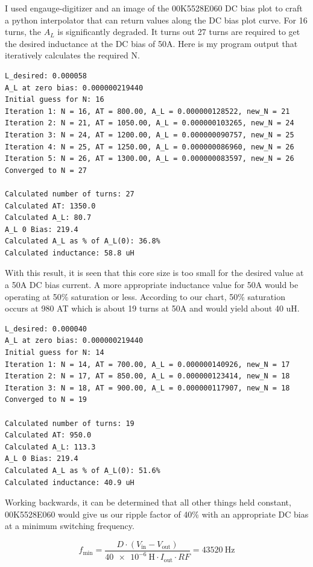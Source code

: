 \documentclass{article}
\begin{document}
I used engauge-digitizer and an image of the 00K5528E060 DC bias plot to craft a python interpolator that can return values along the DC bias plot curve.  For 16 turns, the \( A_L \) is significantly degraded.  It turns out 27 turns are required to get the desired inductance at the DC bias of 50A.  Here is my program output that iteratively calculates the required N.

\begin{verbatim}
L_desired: 0.000058
A_L at zero bias: 0.000000219440
Initial guess for N: 16
Iteration 1: N = 16, AT = 800.00, A_L = 0.000000128522, new_N = 21
Iteration 2: N = 21, AT = 1050.00, A_L = 0.000000103265, new_N = 24
Iteration 3: N = 24, AT = 1200.00, A_L = 0.000000090757, new_N = 25
Iteration 4: N = 25, AT = 1250.00, A_L = 0.000000086960, new_N = 26
Iteration 5: N = 26, AT = 1300.00, A_L = 0.000000083597, new_N = 26
Converged to N = 27

Calculated number of turns: 27
Calculated AT: 1350.0
Calculated A_L: 80.7
A_L 0 Bias: 219.4
Calculated A_L as % of A_L(0): 36.8%
Calculated inductance: 58.8 uH
\end{verbatim}

With this result, it is seen that this core size is too small for the desired value at a 50A DC bias current.  A more appropriate inductance value for 50A would be operating at 50\% saturation or less.  According to our chart, 50\% saturation occurs at 980 AT which is about 19 turns at 50A and would yield about 40 uH.

\begin{verbatim}
L_desired: 0.000040
A_L at zero bias: 0.000000219440
Initial guess for N: 14
Iteration 1: N = 14, AT = 700.00, A_L = 0.000000140926, new_N = 17
Iteration 2: N = 17, AT = 850.00, A_L = 0.000000123414, new_N = 18
Iteration 3: N = 18, AT = 900.00, A_L = 0.000000117907, new_N = 18
Converged to N = 19

Calculated number of turns: 19
Calculated AT: 950.0
Calculated A_L: 113.3
A_L 0 Bias: 219.4
Calculated A_L as % of A_L(0): 51.6%
Calculated inductance: 40.9 uH
\end{verbatim}

Working backwards, it can be determined that all other things held constant, 00K5528E060 would give us our ripple factor of 40\% with an appropriate DC bias at a minimum switching frequency.

\begin{equation}
    f_\text{min} = \frac{D \cdot (V_\text{in} - V_\text{out})}{\SI{40e-6}{\henry} \cdot I_\text{out} \cdot RF} = \SI{43520}{\hertz}
\end{equation}
\end{document}

